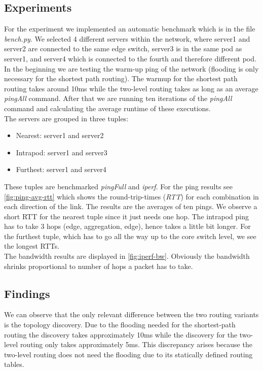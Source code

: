 \documentclass[a4paper,11pt]{article}
\begin{document}
\subsection{Experiments}
For the experiment we implemented an automatic benchmark which is in the file \emph{bench.py}.
We selected 4 different servers within the network, where server1 and server2 are connected to the same edge switch, server3 is in the same pod as server1, and server4 which is connected to the fourth and therefore different pod.
In the beginning we are testing the warm-up ping of the network (flooding is only necessary for the shortest path routing).
The warmup for the shortest path routing takes around 10ms while the two-level routing takes as long as an average \emph{pingAll} command.
After that we are running ten iterations of the \emph{pingAll} command and calculating the average runtime of these executions.\\
The servers are grouped in three tuples:
\begin{itemize}
    \item Nearest: server1 and server2
    \item Intrapod: server1 and server3
    \item Furthest: server1 and server4
\end{itemize}
These tuples are benchmarked \emph{pingFull} and \emph{iperf}.
For the ping results see \autoref{fig:ping-avg-rtt} which shows the round-trip-times (\textit{RTT}) for each combination in each direction of the link.
The results are the averages of ten pings.
We observe a short RTT for the nearest tuple since it just needs one hop.
The intrapod ping has to take 3 hops (edge, aggregation, edge), hence takes a little bit longer.
For the furthest tuple, which has to go all the way up to the core switch level, we see the longest RTTs.\\
The bandwidth results are displayed in \autoref{fig:iperf-bw}.
Obviously the bandwidth shrinks proportional to number of hops a packet has to take.

\subsection{Findings}

We can observe that the only relevant difference between the two routing variants is the topology discovery.
Due to the flooding needed for the shortest-path routing the discovery takes approximately 10ms while the discovery for the two-level routing only takes approximately 5ms.
This discrepancy arises because the two-level routing does not need the flooding due to its statically defined routing tables.
\end{document}
